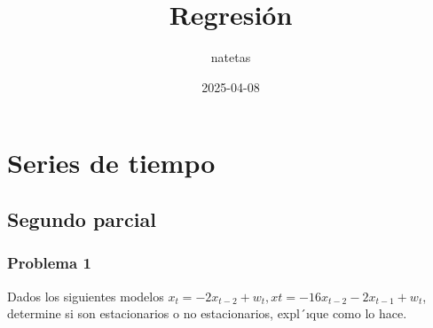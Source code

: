\documentclass[
]{article}
\title{Regresión}
\author{natetas}
\date{2025-04-08}
\begin{document}
\maketitle

\hypertarget{series-de-tiempo}{%
\section{Series de tiempo}\label{series-de-tiempo}}

\hypertarget{segundo-parcial}{%
\subsection{Segundo parcial}\label{segundo-parcial}}

\hypertarget{problema-1}{%
\subsubsection{Problema 1}\label{problema-1}}

Dados los siguientes modelos
\(x_t = −2x_{t−2} + w_t, xt = −16x_{t−2} − 2x_{t−1} + w_t\), determine
si son estacionarios o no estacionarios, expl´ıque como lo hace.
\end{document}
